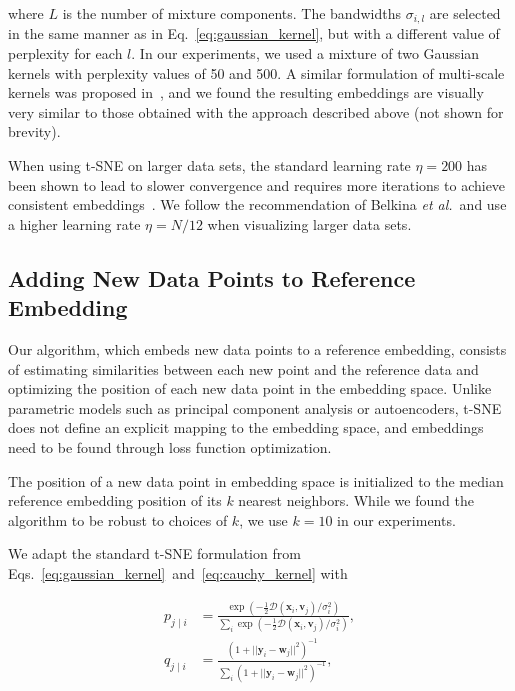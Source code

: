 \documentclass[runningheads]{llncs}
\newcommand{\etal}{\textit{et al.}}
\begin{document}
\noindent where $L$ is the number of mixture components. The bandwidths
$\sigma_{i,l}$ are selected in the same manner as in
Eq.~\ref{eq:gaussian_kernel}, but with a different value of perplexity for each
$l$. In our experiments, we used a mixture of two Gaussian kernels with
perplexity values of 50 and 500. A similar formulation of multi-scale kernels
was proposed in~\cite{Kobak2019}, and we found the resulting embeddings are
visually very similar to those obtained with the approach described above (not
shown for brevity).

When using t-SNE on larger data sets, the standard learning rate $\eta = 200$
has been shown to lead to slower convergence and requires more iterations to
achieve consistent embeddings~\cite{Belkina2019}. We follow the recommendation
of Belkina \etal ~and use a higher learning rate $\eta = N / 12$ when
visualizing larger data sets.


\subsection{Adding New Data Points to Reference Embedding\label{sec:transfer}}

Our algorithm, which embeds new data points to a reference embedding, consists
of estimating similarities between each new point and the reference data and
optimizing the position of each new data point in the embedding space. Unlike
parametric models such as principal component analysis or autoencoders, t-SNE
does not define an explicit mapping to the embedding space, and embeddings need
to be found through loss function optimization.

The position of a new data point in embedding space is initialized to the median
reference embedding position of its $k$ nearest neighbors. While we found the
algorithm to be robust to choices of $k$, we use $k=10$ in our experiments.

We adapt the standard t-SNE formulation from
Eqs.~\ref{eq:gaussian_kernel}~and~\ref{eq:cauchy_kernel} with

\begin{align}
p_{j \mid i} &= \frac{\exp \left ( -\frac{1}{2} \mathcal{D}(\mathbf{x}_i, \mathbf{v}_j) / \sigma_i^2 \right )}{\sum_{i} \exp \left ( -\frac{1}{2} \mathcal{D}(\mathbf{x}_i, \mathbf{v}_j) / \sigma_i^2 \right )}, \\
q_{j \mid i} &= \frac{\left ( 1 + || \mathbf{y}_i - \mathbf{w}_j ||^2 \right )^{-1}}{\sum_{i}\left ( 1 + || \mathbf{y}_i - \mathbf{w}_j ||^2 \right )^{-1}},
\end{align}
\end{document}
